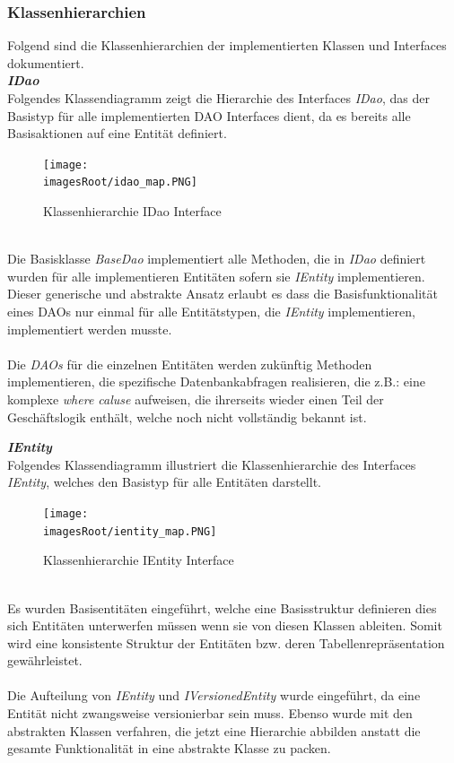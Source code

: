 \documentclass[11pt, a4paper, twoside]{article}   	%
\newcommand{\imagesRoot}{images}
\begin{document}
\newpage
\subsubsection{Klassenhierarchien}
Folgend sind die Klassenhierarchien der implementierten Klassen und Interfaces dokumentiert.\\

\textbf{\emph{IDao}}\\
Folgendes Klassendiagramm zeigt die Hierarchie des Interfaces \emph{IDao}, das der Basistyp für alle implementierten DAO Interfaces dient, da es bereits alle Basisaktionen auf eine Entität definiert.
\begin{figure}[h]
	\centering
	\texttt{[image: \\imagesRoot/idao\_map.PNG]}
	\caption
	{Klassenhierarchie IDao Interface}
\end{figure}
\ \\
Die Basisklasse  \emph{BaseDao} implementiert alle Methoden, die in \emph{IDao} definiert wurden für alle implementieren Entitäten sofern sie \emph{IEntity} implementieren. Dieser generische und abstrakte Ansatz erlaubt es dass die Basisfunktionalität eines DAOs nur einmal für alle Entitätstypen, die \emph{IEntity} implementieren, implementiert werden musste.\\\\
Die \emph{DAOs} für die einzelnen Entitäten werden zukünftig Methoden implementieren, die spezifische Datenbankabfragen realisieren, die z.B.: eine komplexe \emph{where caluse} aufweisen, die ihrerseits wieder einen Teil der Geschäftslogik enthält, welche noch nicht vollständig bekannt ist.

\newpage
\textbf{\emph{IEntity}}\\
Folgendes Klassendiagramm illustriert die Klassenhierarchie des Interfaces \emph{IEntity}, welches den Basistyp für alle Entitäten darstellt.
\begin{figure}[h]
	\centering
	\texttt{[image: \\imagesRoot/ientity\_map.PNG]}
	\caption
	{Klassenhierarchie IEntity Interface}
\end{figure}
\ \\
Es wurden Basisentitäten eingeführt, welche eine Basisstruktur definieren dies sich Entitäten unterwerfen müssen wenn sie von diesen Klassen ableiten. Somit wird eine konsistente Struktur der Entitäten bzw. deren Tabellenrepräsentation gewährleistet.\\\\
Die Aufteilung von \emph{IEntity} und \emph{IVersionedEntity} wurde eingeführt, da eine Entität nicht zwangsweise versionierbar sein muss. Ebenso wurde mit den abstrakten Klassen verfahren, die jetzt eine Hierarchie abbilden anstatt die gesamte Funktionalität in eine abstrakte Klasse zu packen.
\end{document}
